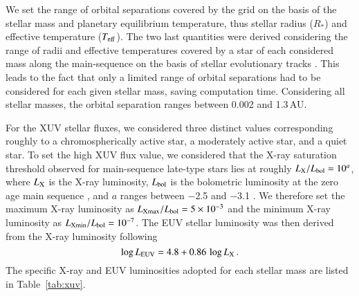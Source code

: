 \documentclass{aa}
\def\Teff{$T_{\rm eff}$}
\begin{document}
{We set the range of orbital separations covered by the grid on
the basis of the stellar mass and planetary equilibrium
temperature, thus stellar radius ($R_*$) and effective temperature
(\Teff). The two last quantities were derived considering the
range of radii and effective temperatures covered by a star of
each considered mass along the main-sequence on the basis of
stellar evolutionary tracks \citep{yi2001}. This leads to the fact
that only a limited range of orbital separations had to be
considered for each given stellar mass, saving computation time.
Considering all stellar masses, the orbital separation ranges
between 0.002 and 1.3\,AU.}

{For the XUV stellar fluxes, we considered three distinct values
corresponding roughly to a chromospherically active star, a
moderately active star, and a quiet star. To set the high XUV flux
value, we considered that the X-ray saturation threshold observed
for main-sequence late-type stars lies at roughly $L_{\rm
X}/L_{\rm bol} = 10^a$, where $L_{\rm X}$ is the X-ray luminosity,
$L_{\rm bol}$ is the bolometric luminosity at the zero age main
sequence \citep{yi2001}, and $a$ ranges between $-$2.5
\citep[e.g.,][]{reiners2014} and $-$3.1
\citep[e.g.,][]{wright2011}. We therefore set the maximum X-ray
luminosity as $L_{\rm Xmax}/L_{\rm bol} = 5\times10^{-3}$ and the
minimum X-ray luminosity as $L_{\rm Xmin}/L_{\rm bol} = 10^{-7}$.
The EUV stellar luminosity was then derived from the X-ray
luminosity following \citep{sanz2011}}
%
\begin{equation}
\log{L_{\rm EUV}} = 4.8 + 0.86\,\log{L_{\rm X}}\,.
\label{eq:X2EUV}
\end{equation}
%
{The specific X-ray and EUV luminosities adopted for each stellar
mass are listed in Table~\ref{tab:xuv}.}
\end{document}

